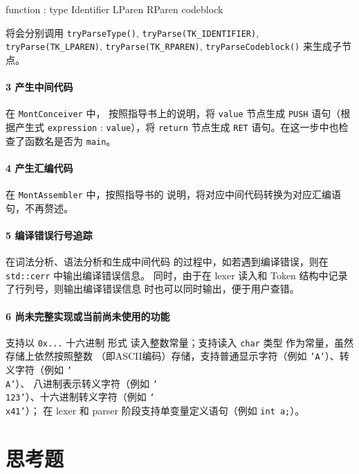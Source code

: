 \documentclass[UTF8]{ctexart}
\newcommand{\T}[1]{\texttt{{#1}}}
\begin{document}
            \centerline{function : type Identifier LParen RParen codeblock}

            \noindent 将会分别调用 \T{tryParseType()}, \T{tryParse(TK\_IDENTIFIER)}, 
            \T{tryParse(TK\_LPAREN)}, \T{tryParse(TK\_RPAREN)}, 
            \T{tryParseCodeblock()} 来生成子节点。

            \paragraph{3 产生中间代码} 在 \T{MontConceiver} 中，
            按照指导书上的说明，将 \T{value} 节点生成 
            \T{PUSH} 语句（根据产生式 \T{expression} : \T{value}），将 \T{return} 
            节点生成 \T{RET} 语句。在这一步中也检查了函数名是否为 \T{main}。

            \paragraph{4 产生汇编代码} 在 \T{MontAssembler} 中，按照指导书的
            说明，将对应中间代码转换为对应汇编语句，不再赘述。

            \paragraph{5 编译错误行号追踪} 在词法分析、语法分析和生成中间代码
            的过程中，如若遇到编译错误，则在 \T{std::cerr} 中输出编译错误信息。
            同时，由于在 lexer 读入和 Token 结构中记录了行列号，则输出编译错误信息
            时也可以同时输出，便于用户查错。

            \paragraph{6 尚未完整实现或当前尚未使用的功能} 支持以 \T{0x...} 十六进制
            形式 读入整数常量；支持读入 \T{char} 类型 作为常量，虽然存储上依然按照整数
            （即ASCII编码）存储，支持普通显示字符（例如 \T{'A'}）、转义字符（例如 \T{'\\A'}）、
            八进制表示转义字符（例如 \T{'\\123'}）、十六进制转义字符（例如 \T{'\\x41'}）；
            在 lexer 和 parser 阶段支持单变量定义语句（例如 \T{int a;}）。
        
    \section{思考题}
\end{document}
